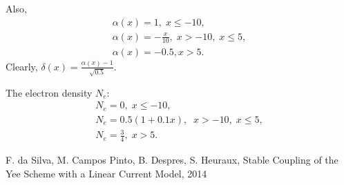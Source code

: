 \documentclass[a4paper,10pt]{article}
\begin{document}
Also, 
\begin{align*}
\alpha(x)=1,\; x\leq -10,\\
\alpha(x)=-\frac{x}{10}, \; x>-10,\; x\leq 5,\\
\alpha(x)=-0.5, x>5.
\end{align*}
Clearly, $\delta(x)=\frac{\alpha(x)-1}{\sqrt{0.5}}$.

The electron density $N_e$:
\begin{align*}
 N_e=0,\; x\leq -10,\\
 N_e=0.5(1+0.1x),\;  \; x>-10,\; x\leq 5,\\
 N_e=\frac{3}{4},\; x>5.
\end{align*}






\begin{thebibliography}{99}
 F. da Silva, M. Campos Pinto, B. Despres, S. Heuraux, Stable Coupling of the Yee Scheme with a Linear Current Model,
2014
\end{thebibliography}
\end{document}
